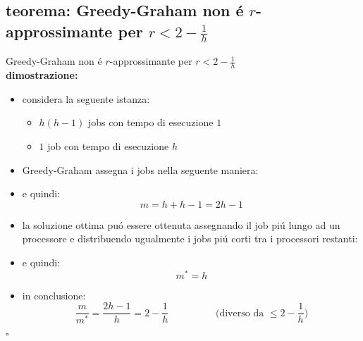 \subsection*{teorema: Greedy-Graham non \'e $r$-approssimante per $r<2-\frac{1}{h}$}
\begin{flushleft}
	Greedy-Graham non \'e $r$-approssimante per $r<2-\frac{1}{h}$ \newline \\
	\vspace{0.5cm}
	\textbf{dimostrazione:}
	\begin{itemize}
		\item considera la seguente istanza:
		\begin{itemize}
			\item $h(h-1)$ jobs con tempo di esecuzione $1$
			\item $1$ job con tempo di esecuzione $h$
		\end{itemize}
		\item Greedy-Graham assegna i jobs nella seguente maniera:
		\item e quindi: $$m=h+h-1=2h-1$$
		\item la soluzione ottima pu\'o essere ottenuta assegnando il job pi\'u lungo ad un processore e distribuendo ugualmente i jobs pi\'u corti tra i processori restanti:
		\item e quindi: $$m^*=h$$
		\item in conclusione:
			$$\frac{m}{m^*}=\frac{2h-1}{h}=2-\frac{1}{h}\hspace{2cm}\text{(diverso da }\leq 2-\frac{1}{h}\text{)}$$
	\end{itemize}
	\hfill$\square$
\end{flushleft}



